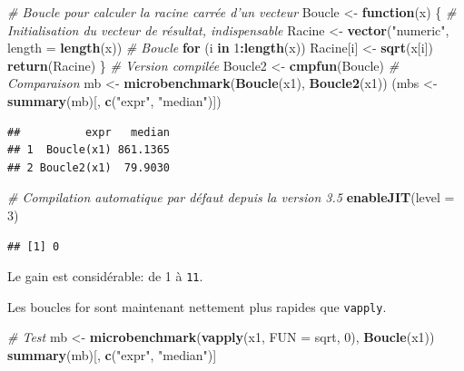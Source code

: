 \documentclass[
  12pt,
  french,
  a4paper,
  extrafontsizes,onecolumn,openright
  ]{memoir}
\newenvironment{Shaded}{\begin{snugshade}}{\end{snugshade}}
\newcommand{\CommentTok}[1]{\textcolor[rgb]{0.56,0.35,0.01}{\textit{#1}}}
\newcommand{\ControlFlowTok}[1]{\textcolor[rgb]{0.13,0.29,0.53}{\textbf{#1}}}
\newcommand{\DataTypeTok}[1]{\textcolor[rgb]{0.13,0.29,0.53}{#1}}
\newcommand{\DecValTok}[1]{\textcolor[rgb]{0.00,0.00,0.81}{#1}}
\newcommand{\KeywordTok}[1]{\textcolor[rgb]{0.13,0.29,0.53}{\textbf{#1}}}
\newcommand{\NormalTok}[1]{#1}
\newcommand{\OperatorTok}[1]{\textcolor[rgb]{0.81,0.36,0.00}{\textbf{#1}}}
\newcommand{\StringTok}[1]{\textcolor[rgb]{0.31,0.60,0.02}{#1}}
\begin{document}
\begin{Shaded}
\begin{Highlighting}[]
\CommentTok{# Boucle pour calculer la racine carrée d'un vecteur}
\NormalTok{Boucle <-}\StringTok{ }\ControlFlowTok{function}\NormalTok{(x) \{}
    \CommentTok{# Initialisation du vecteur de résultat, indispensable}
\NormalTok{    Racine <-}\StringTok{ }\KeywordTok{vector}\NormalTok{(}\StringTok{"numeric"}\NormalTok{, }\DataTypeTok{length =} \KeywordTok{length}\NormalTok{(x))}
    \CommentTok{# Boucle}
    \ControlFlowTok{for}\NormalTok{ (i }\ControlFlowTok{in} \DecValTok{1}\OperatorTok{:}\KeywordTok{length}\NormalTok{(x)) Racine[i] <-}\StringTok{ }\KeywordTok{sqrt}\NormalTok{(x[i])}
    \KeywordTok{return}\NormalTok{(Racine)}
\NormalTok{\}}
\CommentTok{# Version compilée}
\NormalTok{Boucle2 <-}\StringTok{ }\KeywordTok{cmpfun}\NormalTok{(Boucle)}
\CommentTok{# Comparaison}
\NormalTok{mb <-}\StringTok{ }\KeywordTok{microbenchmark}\NormalTok{(}\KeywordTok{Boucle}\NormalTok{(x1), }\KeywordTok{Boucle2}\NormalTok{(x1))}
\NormalTok{(mbs <-}\StringTok{ }\KeywordTok{summary}\NormalTok{(mb)[, }\KeywordTok{c}\NormalTok{(}\StringTok{"expr"}\NormalTok{, }\StringTok{"median"}\NormalTok{)])}
\end{Highlighting}
\end{Shaded}

\begin{verbatim}
##          expr   median
## 1  Boucle(x1) 861.1365
## 2 Boucle2(x1)  79.9030
\end{verbatim}

\begin{Shaded}
\begin{Highlighting}[]
\CommentTok{# Compilation automatique par défaut depuis la version 3.5}
\KeywordTok{enableJIT}\NormalTok{(}\DataTypeTok{level =} \DecValTok{3}\NormalTok{)}
\end{Highlighting}
\end{Shaded}

\begin{verbatim}
## [1] 0
\end{verbatim}

\normalsize
Le gain est considérable: de 1 à \texttt{11}.

Les boucles for sont maintenant nettement plus rapides que \texttt{vapply}.

\scriptsize

\begin{Shaded}
\begin{Highlighting}[]
\CommentTok{# Test}
\NormalTok{mb <-}\StringTok{ }\KeywordTok{microbenchmark}\NormalTok{(}\KeywordTok{vapply}\NormalTok{(x1, }\DataTypeTok{FUN =}\NormalTok{ sqrt, }\DecValTok{0}\NormalTok{), }\KeywordTok{Boucle}\NormalTok{(x1))}
\KeywordTok{summary}\NormalTok{(mb)[, }\KeywordTok{c}\NormalTok{(}\StringTok{"expr"}\NormalTok{, }\StringTok{"median"}\NormalTok{)]}
\end{Highlighting}
\end{Shaded}
\end{document}
